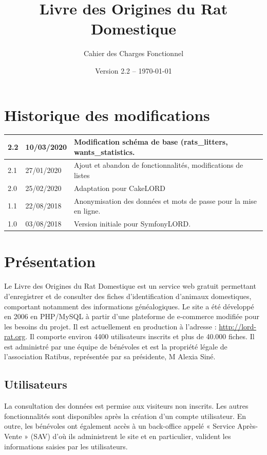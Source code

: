 \documentclass[a4paper,10pt]{article}
\title{Livre des Origines du Rat Domestique}
\author{Cahier des Charges Fonctionnel}
\date{Version 2.2 -- \today}
\begin{document}
\maketitle

\section*{Historique des modifications}

\large
\noindent\begin{tabularx}{\textwidth}{|l|l|X|}\hline
\textbf{2.2} & \textbf{10/03/2020} & \textbf{Modification schéma de base (rats\_litters, wants\_statistics.}\\\hline
2.1 & 27/01/2020 & Ajout et abandon de fonctionnalités, modifications de listes\\\hline
2.0 & 25/02/2020 & Adaptation pour CakeLORD\\\hline
1.1 & 22/08/2018 & Anonymisation des données et mots de passe pour la mise en ligne.\\\hline
1.0 & 03/08/2018 & Version initiale pour SymfonyLORD.\\\hline
\end{tabularx}
\normalsize

\vfill

\tableofcontents

\section{Présentation}
Le Livre des Origines du Rat Domestique est un service web gratuit permettant d'enregistrer et de consulter des fiches d'identification d'animaux domestiques, comportant notamment des informations généalogiques. Le site a été développé en 2006 en PHP/MySQL à partir d'une plateforme de e-commerce modifiée pour les besoins du projet. Il est actuellement en production à l'adresse : \url{http://lord-rat.org}. Il comporte environ 4400 utilisateurs inscrits et plus de 40.000 fiches. Il est administré par une équipe de bénévoles et est la propriété légale de l'association Ratibus, représentée par sa présidente, M Alexia Siné.

\subsection{Utilisateurs}
La consultation des données est permise aux visiteurs non inscrits. Les autres fonctionnalités sont disponibles après la création d'un compte utilisateur. En outre, les bénévoles ont également accès à un back-office appelé « Service Après-Vente » (SAV) d'où ils administrent le site et en particulier, valident les informations saisies par les utilisateurs.
\end{document}
